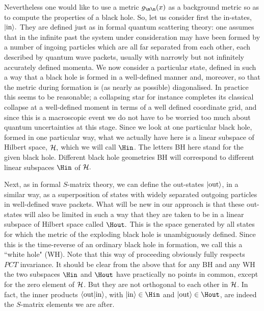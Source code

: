 Nevertheless one would like to use a metric $g_{\m\n}(x)$ as a
background metric so as to compute the properties of a black hole. So,
let us consider first the in-states, $|{\rm in}\rangle.$ They are
defined just as in formal quantum scattering theory: one assumes that
in the infinite past the system under consideration may have been
formed by a number of ingoing particles which are all far separated
from each other, each described by quantum wave packets, usually with
narrowly but not infinitely accurately defined momenta. We now consider
a particular state, defined in such a way that a black hole is formed
in a well-defined manner and, moreover, so that the metric during
formation is (as nearly as possible) diagonalised. In practice this
seems to be reasonable; a collapsing star for instance completes its
classical collapse at a well-defined moment in terms of a well defined
coordinate grid, and since this is a macroscopic event we do not have
to be worried too much about quantum uncertainties at this stage. Since
we look at one particular black hole, formed in one particular way,
what we actually have here is a linear subspace of Hilbert space, $\cal
H,$ which we will call $\Hin$. The letters {\smallrm BH } here stand
for the given black hole. Different black hole geometries {\smallrm BH}
will correspond to different linear subspaces $\Hin$ of $\cal H.$

Next, as in formal $S$-matrix theory, we can define the out-states
$|{\rm out} \rangle$, in a similar way, as a superposition of states with
widely separated outgoing particles in well-defined wave packets. What
will be new in our approach is that these out-states will also be
limited in such a way that they are taken to be in a linear subspace of
Hilbert space called $\Hout.$ This is the space generated by all states
for which the metric of the exploding black hole is unambiguously
defined. Since this is the time-reverse of an ordinary black hole in
formation, we call this a ``white hole" ({\smallrm WH}). Note that this
way of proceeding obviously fully respects $PCT$ invariance.
It should be clear from the above that for any {\smallrm BH} and any
{\smallrm WH} the two subspaces $\Hin$ and $\Hout$ have practically no
points in common, except for the zero element of $\cal H$. But they are
not orthogonal to each other in $\cal H$. In fact, the inner products
$\langle {\rm out|in}\rangle$, with $|\rm in \rangle \in \Hin$ and
$|\rm out \rangle \in \Hout$, are indeed the $S$-matrix elements we are
after.

